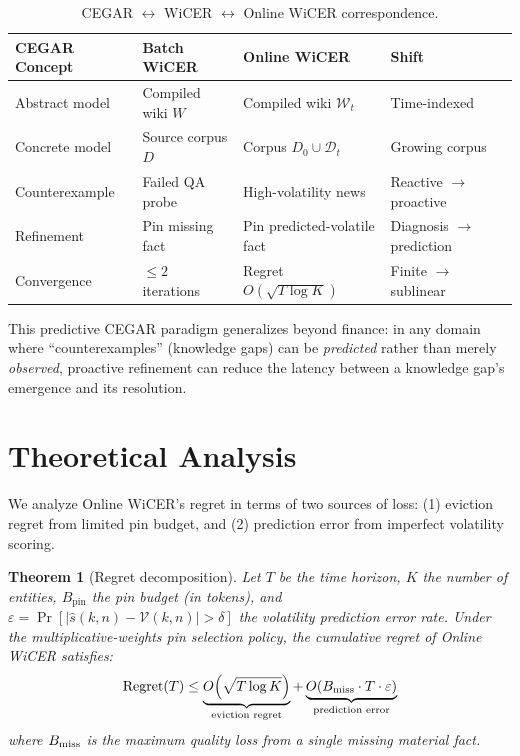 \documentclass{article}
\newtheorem{theorem}{Theorem}[section]
\newcommand{\wt}{\mathcal{W}_t}
\newcommand{\dt}{\mathcal{D}_t}
\newcommand{\voltarget}{\mathcal{V}}
\begin{document}
\begin{table}[t]
\centering
\caption{CEGAR $\leftrightarrow$ WiCER $\leftrightarrow$ Online WiCER correspondence.}
\label{tab:cegar}
\small
\begin{tabular}{@{}lp{3.2cm}p{3.2cm}p{3.8cm}@{}}
\toprule
\textbf{CEGAR Concept} & \textbf{Batch WiCER} & \textbf{Online WiCER} & \textbf{Shift} \\
\midrule
Abstract model & Compiled wiki $W$ & Compiled wiki $\wt$ & Time-indexed \\
Concrete model & Source corpus $D$ & Corpus $D_0 \cup \dt$ & Growing corpus \\
Counterexample & Failed QA probe & High-volatility news & Reactive $\to$ proactive \\
Refinement & Pin missing fact & Pin predicted-volatile fact & Diagnosis $\to$ prediction \\
Convergence & $\leq 2$ iterations & Regret $O(\sqrt{T \log K})$ & Finite $\to$ sublinear \\
\bottomrule
\end{tabular}
\end{table}

This predictive CEGAR paradigm generalizes beyond finance: in any domain where ``counterexamples'' (knowledge gaps) can be \emph{predicted} rather than merely \emph{observed}, proactive refinement can reduce the latency between a knowledge gap's emergence and its resolution.

\section{Theoretical Analysis}
\label{sec:theory}

We analyze Online WiCER's regret in terms of two sources of loss: (1) eviction regret from limited pin budget, and (2) prediction error from imperfect volatility scoring.

\begin{theorem}[Regret decomposition]
\label{thm:regret}
Let $T$ be the time horizon, $K$ the number of entities, $B_{\text{pin}}$ the pin budget (in tokens), and $\varepsilon = \Pr[|\hat{s}(k,n) - \voltarget(k,n)| > \delta]$ the volatility prediction error rate.
Under the multiplicative-weights pin selection policy, the cumulative regret of Online WiCER satisfies:
\begin{equation}
  \textup{Regret}(T) \leq \underbrace{O\!\left(\sqrt{T \log K}\right)}_{\textup{eviction regret}} + \underbrace{O\!\left(B_{\textup{miss}} \cdot T \cdot \varepsilon\right)}_{\textup{prediction error}}
  \label{eq:regret_bound}
\end{equation}
where $B_{\textup{miss}}$ is the maximum quality loss from a single missing material fact.
\end{theorem}
\end{document}

